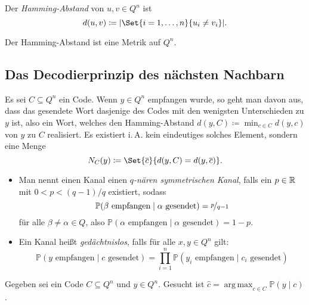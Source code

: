\documentclass{cheat-sheet}
\renewcommand{\P}{\mathbb{P}} %
\newcommand{\CP}[2]{\P({#1}\mid{#2})} %
\DeclareMathOperator*{\argmax}{arg\,max}
\begin{document}
\begin{samepage}

\begin{defn}
  Der \emph{Hamming-Abstand} von $u, v \in Q^n$ ist
  \[ d(u, v) \coloneqq \abs{\Set{i=1,\ldots,n}{u_i \neq v_i}}. \]
\end{defn}

\begin{lem}
  Der Hamming-Abstand ist eine Metrik auf $Q^n$.
\end{lem}

\subsection{Das Decodierprinzip des nächsten Nachbarn}

\end{samepage}

\begin{nota}
  Es sei $C \subseteq Q^n$ ein Code.
  Wenn $y \in Q^n$ empfangen wurde, so geht man davon aus, dass das gesendete Wort dasjenige des Codes mit den wenigsten Unterschieden zu $y$ ist, also ein Wort, welches den Hamming-Abstand $d(y, C) \coloneqq {\min}_{c \in C} d(y, c)$ von $y$ zu $C$ realisiert.
  Es existiert i.\,A. kein eindeutiges solches Element, sondern eine Menge
  \[ N_C(y) \coloneqq \Set{\overline{c}}{d(y, C) = d(y, \overline{c})}. \]
\end{nota}

\begin{defn}
  \begin{itemize}
    \item Man nennt einen Kanal einen \emph{$q$-nären symmetrischen Kanal}, falls ein $p \in \mathbb{R}$ mit $0 < p < (q-1)/q$ existiert, sodass
    \[ \CP{\text{$\beta$ empfangen}}{\text{$\alpha$ gesendet}} = \nicefrac{p}{q-1} \]
    für alle $\beta \neq \alpha \in Q$, also $\CP{\text{$\alpha$ empfangen}}{\text{$\alpha$ gesendet}} = 1-p$.
    \item Ein Kanal heißt \emph{gedächtnislos}, falls für alle $x, y \in Q^n$ gilt:
    \[ \CP{\text{$y$ empfangen}}{\text{$c$ gesendet}} = \prod_{i=1}^n \CP{\text{$y_i$ empfangen}}{\text{$c_i$ gesendet}} \]
  \end{itemize}
\end{defn}

\begin{defn}
  Gegeben sei ein Code $C \subseteq Q^n$ und $y \in Q^n$.
  Gesucht ist $\hat{c} = {\argmax}_{c \in C} \CP{y}{c}$.
\end{defn}
\end{document}
